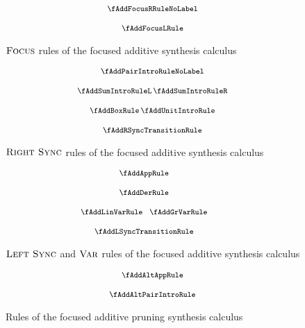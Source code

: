 \begin{figure}[H]
  \begin{align*}
    {\footnotesize{
\begin{array}{c}
  \fAddFocusRRuleNoLabel
  \\[1.25em]
  \fAddFocusLRule
  \end{array}
    }}
  \end{align*}
  \caption{$\textsc{Focus}$ rules of the focused additive synthesis calculus}
  \label{fig:focus-add-focus}
\end{figure}

\begin{figure}[H]
  \begin{align*}
    {\footnotesize{
\begin{array}{c}
  \fAddPairIntroRuleNoLabel
  \\[1.25em]
  \fAddSumIntroRuleL
  \,
  \fAddSumIntroRuleR
  \\[1.25em]
  \fAddBoxRule
  \,
  \fAddUnitIntroRule
  \\[1.25em]
  \fAddRSyncTransitionRule
  \end{array}
    }}
  \end{align*}
  \caption{$\textsc{Right Sync}$ rules of the focused additive synthesis calculus}
  \label{fig:focus-add-right-sync}
\end{figure}

\begin{figure}[H]
  \begin{align*}
    {\footnotesize{
\hspace{-2em}\begin{array}{c}
  \fAddAppRule
  \\[1.25em]
  \fAddDerRule
  \\[1.25em]
  \fAddLinVarRule
  \;\;\;
  \fAddGrVarRule
  \\[1.25em]
  \fAddLSyncTransitionRule
  \end{array}
    }}
  \end{align*}
  \caption{$\textsc{Left Sync}$ and $\textsc{Var}$ rules of the focused additive
  synthesis calculus}
  \label{fig:focus-add-left-sync}
\end{figure}

\begin{figure}[H]
  \begin{align*}
    {\footnotesize{
\begin{array}{c}
\fAddAltAppRule
  \\[1.25em]
\fAddAltPairIntroRule
  \end{array}
    }}
  \end{align*}
  \caption{Rules of the focused additive pruning synthesis calculus}
  \label{fig:focus-add-pruning}
\end{figure}

